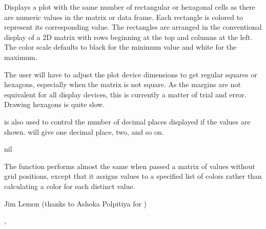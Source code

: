 \begin{Details}\relax
Displays a plot with the same number of rectangular or hexagonal cells as
there are numeric values in the matrix or data frame. Each rectangle is
colored to represent its corresponding value. The rectangles are arranged
in the conventional display of a 2D matrix with rows beginning at the top
and columns at the left. The color scale defaults to black for the minimum
value and white for the maximum.

The user will have to adjust the plot device dimensions to get regular
squares or hexagons, especially when the matrix is not square. As the
margins are not equivalent for all display devices, this is currently
a matter of trial and error. Drawing hexagons is quite slow.

 is also used to control the number of decimal places
displayed if the values are shown.  will give one decimal
place,  two, and so on.
\end{Details}
\begin{Value}
nil
\end{Value}
\begin{Note}\relax
The function  performs almost the same when passed a
matrix of values without grid positions, except that it assigns values to
a specified list of colors rather than calculating a color for each distinct
value.
\end{Note}
\begin{Author}\relax
Jim Lemon (thanks to Ashoka Polpitiya for )
\end{Author}
\begin{SeeAlso}\relax
{}, 
\end{SeeAlso}
